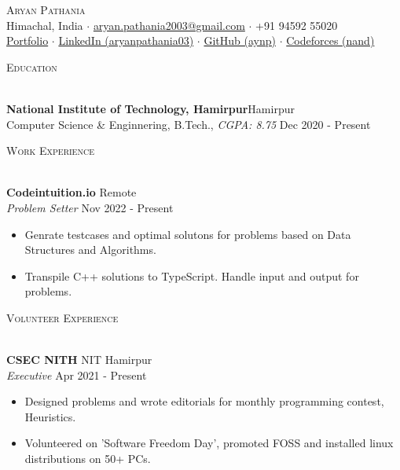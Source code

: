 \documentclass[a4paper]{article}
\newcommand{\lineunder} {
    \vspace*{-8pt} \\
    \hspace*{-18pt} \hrulefill \\
}
\newcommand{\header} [1] {
    {\hspace*{-18pt}\vspace*{6pt} \textsc{#1}}
    \vspace*{-6pt} \lineunder
}
\begin{document}

\begin{center}
	{\Huge \scshape {Aryan Pathania}}\\
	\vspace{0.5mm}
	Himachal, India $\cdot$ \href{mailto: aryan.pathania2003@gmail.com}{aryan.pathania2003@gmail.com} $\cdot$ +91 94592 55020\\
	\vspace{0.5mm}
	\href{https://aryanpathania.vercel.app/}{Portfolio} $\cdot$
	\href{https://linkedin.com/in/aryanpathania03/}{LinkedIn (aryanpathania03)} $\cdot$
	\href{https://www.github.com/aynp}{GitHub (aynp)} $\cdot$
	\href{https://www.github.com/aynp}{Codeforces (nand)} \\
\end{center}

\vspace{-4mm}

\header{Education}
\vspace{1mm}

\textbf{National Institute of Technology, Hamirpur}\hfill Hamirpur\\
Computer Science \& Enginnering, B.Tech., \textit{CGPA: 8.75} \hfill Dec 2020 - Present\\
\vspace{1.5mm}


\header{Work Experience}
\vspace{1mm}

\textbf{Codeintuition.io} \hfill Remote\\
\textit{Problem Setter} \hfill Nov 2022 - Present\\
\begin{itemize}
	\item Genrate testcases and optimal solutons for problems based on Data Structures and Algorithms.
	\item Transpile C++ solutions to TypeScript. Handle input and output for problems.
\end{itemize}
\vspace{1.5mm}


\header{Volunteer Experience}
\vspace{1mm}

\textbf{CSEC NITH} \hfill NIT Hamirpur\\
\textit{Executive} \hfill Apr 2021 - Present\\
\begin{itemize}
	\item Designed problems and wrote editorials for monthly programming contest, Heuristics.
	\item Volunteered on 'Software Freedom Day', promoted FOSS and installed linux distributions on 50+ PCs.
\end{itemize}
\vspace{1.5mm}
\end{document}
